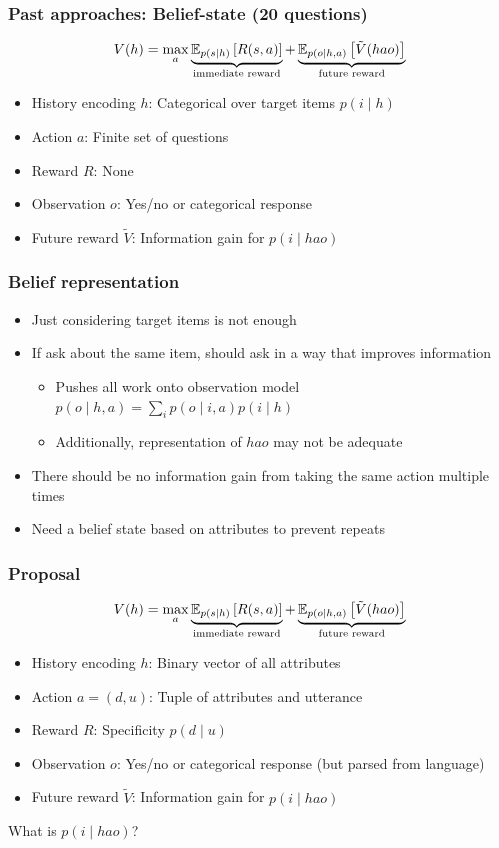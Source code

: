 \documentclass{beamer}
\begin{document}
\begin{frame}
\frametitle{Past approaches: Belief-state (20 questions)}
\begin{equation*}
V(h) = \max_a \underbrace{\mathbb{E}_{p(s \mid h)}\left[R(s, a)\right]}_{\text{immediate reward}}
+ \underbrace{\mathbb{E}_{p(o\mid h, a)}\left[\tilde{V}(hao)\right]}_{\text{future reward}}
\end{equation*}
    \begin{itemize}
    \item History encoding $h$: Categorical over target items $p(i \mid h)$
    \item Action $a$: Finite set of questions
    \item Reward $R$: None
    \item Observation $o$: Yes/no or categorical response
    \item Future reward $\tilde{V}$: Information gain for $p(i \mid hao)$
    \end{itemize}
\end{frame}

\begin{frame}
\frametitle{Belief representation}
\begin{itemize}
\item Just considering target items is not enough
\item If ask about the same item, should ask in a way that improves information
    \begin{itemize}
    \item Pushes all work onto observation model $p(o \mid h, a) = \sum_ip(o \mid i, a)p(i \mid h)$
    \item Additionally, representation of $hao$ may not be adequate
    \end{itemize}
\item There should be no information gain from taking the same action multiple times
\item Need a belief state based on attributes to prevent repeats
\end{itemize}
\end{frame}

\begin{frame}
\frametitle{Proposal}
\begin{equation*}
V(h) = \max_a \underbrace{\mathbb{E}_{p(s \mid h)}\left[R(s, a)\right]}_{\text{immediate reward}}
+ \underbrace{\mathbb{E}_{p(o\mid h, a)}\left[\tilde{V}(hao)\right]}_{\text{future reward}}
\end{equation*}
    \begin{itemize}
    \item History encoding $h$: Binary vector of all attributes
    \item Action $a = (d, u)$: Tuple of attributes and utterance
    \item Reward $R$: Specificity $p(d \mid u)$
    \item Observation $o$: Yes/no or categorical response (but parsed from language)
    \item Future reward $\tilde{V}$: Information gain for $p(i \mid hao)$
    \end{itemize}

What is $p(i\mid hao)$?
\end{frame}
\end{document}
